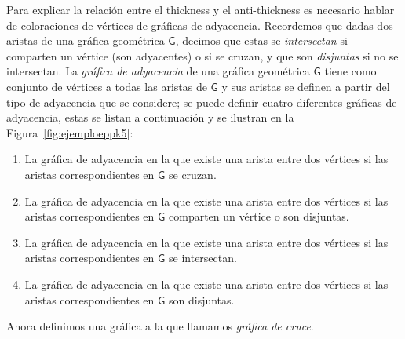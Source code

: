 
Para explicar la relación entre el thickness y el anti-thickness es necesario
hablar de coloraciones de vértices de gráficas de adyacencia. Recordemos que
dadas dos aristas de una gráfica geométrica $\mathsf{G}$, decimos que estas
se \emph{intersectan} si comparten un vértice (son adyacentes) o si se cruzan,
y que son \emph{disjuntas} si no se intersectan. La \emph{gráfica de
adyacencia} de una gráfica geométrica $\mathsf{G}$ tiene como conjunto de
vértices a todas las aristas de $\mathsf{G}$ y sus aristas se definen a partir
del tipo de adyacencia que se considere; se puede definir cuatro diferentes
gráficas de adyacencia, estas se listan a continuación y se ilustran en la
Figura~\ref{fig:ejemploeppk5}:
\begin{enumerate}
  \item \label{itm:epp}La gráfica de adyacencia en la que existe una arista
  entre dos vértices si las aristas correspondientes en $\mathsf{G}$ se cruzan.
  \item  \label{itm:W} La gráfica de adyacencia en la que existe una arista
  entre dos vértices si las aristas correspondientes en $\mathsf{G}$ comparten
  un vértice o son disjuntas.
  \item  \label{itm:I} La gráfica de adyacencia en la que existe una arista
  entre dos vértices si las aristas correspondientes en $\mathsf{G}$ se
  intersectan.
  \item \label{itm:D}  La gráfica de adyacencia en la que existe una arista
  entre dos vértices si las aristas correspondientes en $\mathsf{G}$ son
  disjuntas.
\end{enumerate}

Ahora definimos una gráfica a la que llamamos \emph{gráfica de cruce}.

